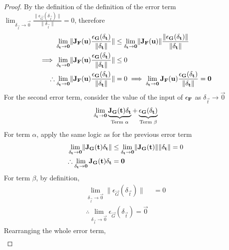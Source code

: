 \begin{lemma}
\begin{proof}
        By the definition of the definition of the error term $\lim_{\delta_\vec{t}\rightarrow\vec{0}}\frac{\lVert\epsilon_\vec{G}(\delta_\vec{t})\rVert}{\lVert\delta_\vec{t}\rVert}=0$, therefore
        \begin{align*}
            \lim_{\delta_{\mathbf{t}}\rightarrow\mathbf{0}}\lVert\mathbf{J}_{\mathbf{F}}(\mathbf{u})\frac{\epsilon_{\mathbf{G}}(\delta_{\mathbf{t}})}{\lVert\delta_{\mathbf{t}}\rVert}\rVert&\leq\lim_{\delta_{\mathbf{t}}\rightarrow\mathbf{0}}\lVert\mathbf{J}_{\mathbf{F}}(\mathbf{u})\rVert\frac{\lVert\epsilon_{\mathbf{G}}(\delta_{\mathbf{t}})\rVert}{\lVert\delta_{\mathbf{t}}\rVert}\\
            \implies\lim_{\delta_{\mathbf{t}}\rightarrow\mathbf{0}}\lVert\mathbf{J}_{\mathbf{F}}(\mathbf{u})\frac{\epsilon_{\mathbf{G}}(\delta_{\mathbf{t}})}{\lVert\delta_{\mathbf{t}}\rVert}\rVert&\leq0\\
            \therefore\lim_{\delta_{\mathbf{t}}\rightarrow\mathbf{0}}\lVert\mathbf{J}_{\mathbf{F}}(\mathbf{u})\frac{\epsilon_{\mathbf{G}}(\delta_{\mathbf{t}})}{\lVert\delta_{\mathbf{t}}\rVert}\rVert&=0\implies\lim_{\delta_{\mathbf{t}}\rightarrow\mathbf{0}}\mathbf{J}_{\mathbf{F}}(\mathbf{u})\frac{\epsilon_{\mathbf{G}}(\delta_{\mathbf{t}})}{\lVert\delta_{\mathbf{t}}\rVert}=\mathbf{0}
        \end{align*}
        For the second error term, consider the value of the input of $\epsilon_{\mathbf{F}}$ as $\delta_\vec{t}\rightarrow\vec{0}$
        $$
            \lim_{\delta_{\mathbf{t}}\rightarrow\mathbf{0}}\underbrace{\mathbf{J}_{\mathbf{G}}(\mathbf{t})\delta_{\mathbf{t}}}_{\text{Term }\alpha}+\underbrace{\epsilon_{\mathbf{G}}(\delta_{\mathbf{t}})}_{\text{Term }\beta}
        $$
        For term $\alpha$, apply the same logic as for the previous error term
        \begin{align*}
            \lim_{\delta_{\mathbf{t}}\rightarrow\mathbf{0}}\lVert\mathbf{J}_{\mathbf{G}}(\mathbf{t})\delta_{\mathbf{t}}\rVert&\leq\lim_{\delta_{\mathbf{t}}\rightarrow\mathbf{0}}\lVert\mathbf{J}_{\mathbf{G}}(\mathbf{t})\rVert\lVert\delta_{\mathbf{t}}\rVert=0\\
            \therefore\lim_{\delta_{\mathbf{t}}\rightarrow\mathbf{0}}\mathbf{J}_{\mathbf{G}}(\mathbf{t})\delta_{\mathbf{t}}&=\mathbf{0}
        \end{align*}
        For term $\beta$, by definition,
        \begin{align*}
            \lim_{\delta_\vec{t}\rightarrow\vec{0}}\lVert\epsilon_\vec{G}(\delta_\vec{t})\rVert&=0\\
            \therefore\lim_{\delta_\vec{t}\rightarrow\vec{0}}\epsilon_\vec{G}(\delta_\vec{t})=\vec{0}
        \end{align*}
        Rearranging the whole error term,
        \begin{align*}

\end{align*}
\end{proof}
\end{lemma}
